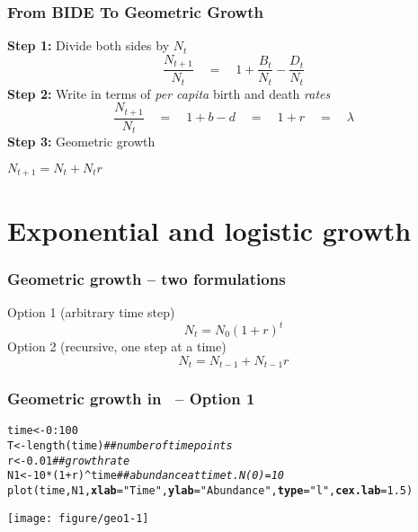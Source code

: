 \documentclass[color=usenames,dvipsnames]{beamer}\usepackage[]{graphicx}\usepackage[]{color}
\makeatletter
\newcommand{\hlnum}[1]{\textcolor[rgb]{0.69,0.494,0}{#1}}%
\newcommand{\hlstr}[1]{\textcolor[rgb]{0.749,0.012,0.012}{#1}}%
\newcommand{\hlcom}[1]{\textcolor[rgb]{0.514,0.506,0.514}{\textit{#1}}}%
\newcommand{\hlopt}[1]{\textcolor[rgb]{0,0,0}{#1}}%
\newcommand{\hlstd}[1]{\textcolor[rgb]{0,0,0}{#1}}%
\newcommand{\hlkwb}[1]{\textcolor[rgb]{0,0.341,0.682}{#1}}%
\newcommand{\hlkwc}[1]{\textcolor[rgb]{0,0,0}{\textbf{#1}}}%
\newcommand{\hlkwd}[1]{\textcolor[rgb]{0.004,0.004,0.506}{#1}}%
\newenvironment{kframe}{%
 \def\at@end@of@kframe{}%
 \ifinner\ifhmode%
  \def\at@end@of@kframe{\end{minipage}}%
  \begin{minipage}{\columnwidth}%
 \fi\fi%
 \def\FrameCommand##1{\hskip\@totalleftmargin \hskip-\fboxsep
 \colorbox{shadecolor}{##1}\hskip-\fboxsep
     \hskip-\linewidth \hskip-\@totalleftmargin \hskip\columnwidth}%
 \MakeFramed {\advance\hsize-\width
   \@totalleftmargin\z@ \linewidth\hsize
   \@setminipage}}%
 {\par\unskip\endMakeFramed%
 \at@end@of@kframe}
\newenvironment{knitrout}{}{} %
\makeatother
\begin{document}
\begin{frame}
  \frametitle{From {\color{red} BIDE} To Geometric Growth}
    \textbf{Step 1:} Divide both sides by $N_{t}$
      \[
        \frac{N_{t+1}}{N_{t}} \quad = \quad 1 + \frac{B_t}{N_{t}} - \frac{D_t}{N_{t}}
      \]
   \pause
    \textbf{Step 2:} Write in terms of \textit{per capita} birth and death \textit{rates}
      \[
        \frac{N_{t+1}}{N_{t}} \quad  = \quad 1 + b - d \quad = \quad 1 + r \quad = \quad \lambda
      \]
    \pause
    \textbf{Step 3:} Geometric growth \par
    \begin{center}
      $N_{t+1} = N_t + N_tr$
    \end{center}
\end{frame}






\section{Exponential and logistic growth}


\begin{frame}
  \frametitle{Geometric growth -- two formulations}
  Option 1 (arbitrary time step)
  \[
    N_t = N_0(1+r)^t
  \]
  \pause
  \vfill
  Option 2 (recursive, one step at a time)
  \[
    N_t = N_{t-1} + N_{t-1}r
  \]
\end{frame}




\begin{frame}[fragile]
  \frametitle{Geometric growth in \R~-- Option 1}
\begin{knitrout}\scriptsize
{}\color{fgcolor}\begin{kframe}
\begin{alltt}
\hlstd{time} \hlkwb{<-} \hlnum{0}\hlopt{:}\hlnum{100}
\hlstd{T} \hlkwb{<-} \hlkwd{length}\hlstd{(time)}     \hlcom{## number of time points}
\hlstd{r} \hlkwb{<-} \hlnum{0.01}             \hlcom{## growth rate}
\hlstd{N1} \hlkwb{<-} \hlnum{10}\hlopt{*}\hlstd{(}\hlnum{1}\hlopt{+}\hlstd{r)}\hlopt{^}\hlstd{time}   \hlcom{## abundance at time t. N(0)=10}
\hlkwd{plot}\hlstd{(time, N1,} \hlkwc{xlab}\hlstd{=}\hlstr{"Time"}\hlstd{,} \hlkwc{ylab}\hlstd{=}\hlstr{"Abundance"}\hlstd{,} \hlkwc{type}\hlstd{=}\hlstr{"l"}\hlstd{,} \hlkwc{cex.lab}\hlstd{=}\hlnum{1.5}\hlstd{)}
\end{alltt}
\end{kframe}

{\centering \texttt{[image: figure/geo1-1]} 

}



\end{knitrout}
\end{frame}
\end{document}
